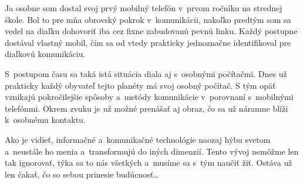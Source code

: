 Ja osobne som dostal svoj prvý mobilný telefón v~prvom ročníku na strednej škole. Bol to pre mňa obrovský pokrok v~komunikácii, nakoľko predtým som sa vedel na diaľku dohovoriť iba cez fixne zabudovanú pevnú linku. Každý postupne dostával vlastný mobil, čím sa od vtedy prakticky jednoznačne identifikoval pre diaľkovú komunikáciu.

S~postupom času sa taká istá situácia diala aj s~osobnými počítačmi. Dnes už prakticky každý obyvateľ tejto planéty má svoj osobný počítač. S tým opäť vznikajú pokročilejšie spôsoby a~metódy komunikácie v~porovnaní s~mobilnými telefónmi. Okrem zvuku je už možné prenášať aj obraz, čo sa už náramne blíži k~osobnému kontaktu.

Ako je vidieť, informačné a~komunikačné technológie naozaj hýbu svetom a~neustále ho menia a~transformujú do iných dimenzií. Tento vývoj nemôžme len tak ignorovať, týka sa to nás všetkých a~musíme sa s~tým naučiť žiť. Ostáva už len čakať, čo so sebou prinesie budúcnosť\dots